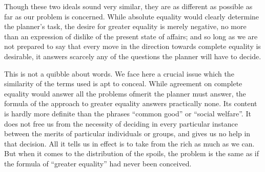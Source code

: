 \documentclass[11pt,openany]{book}
\begin{document}
Though these two ideals sound very similar, they are as different as possible as far as our problem is concerned. While absolute equality would clearly determine the planner's task, the desire for greater equality is merely negative, no more than an expression of dislike of the present state of affairs; and so long as we are not prepared to say that every move in the direction towards complete equality is desirable, it answers scarcely any of the questions the planner will have to decide.

This is not a quibble about words. We face here a crucial issue which the similarity of the terms used is apt to conceal. While agreement on complete equality would answer all the problems ofmerit the planner must answer, the formula of the approach to greater equality answers practically none. Its content is hardly more definite than the phrases ``common good'' or ``social welfare''. It does not free us from the necessity of deciding in every particular instance between the merits of particular individuals or groups, and gives us no help in that decision. All it tells us in effect is to take from the rich as much as we can. But when it comes to the distribution of the spoils, the problem is the same as if the formula of ``greater equality'' had never been conceived.

\begin{center}\textasteriskcentered\hspace{0.9em}\textasteriskcentered\hspace{0.9em}\textasteriskcentered\end{center}

\begin{center}\textasteriskcentered\hspace{0.9em}\textasteriskcentered\hspace{0.9em}\textasteriskcentered\end{center}

\begin{center}\textasteriskcentered\hspace{0.9em}\textasteriskcentered\hspace{0.9em}\textasteriskcentered\end{center}

\begin{center}\textasteriskcentered\hspace{0.9em}\textasteriskcentered\hspace{0.9em}\textasteriskcentered\end{center}
\end{document}
